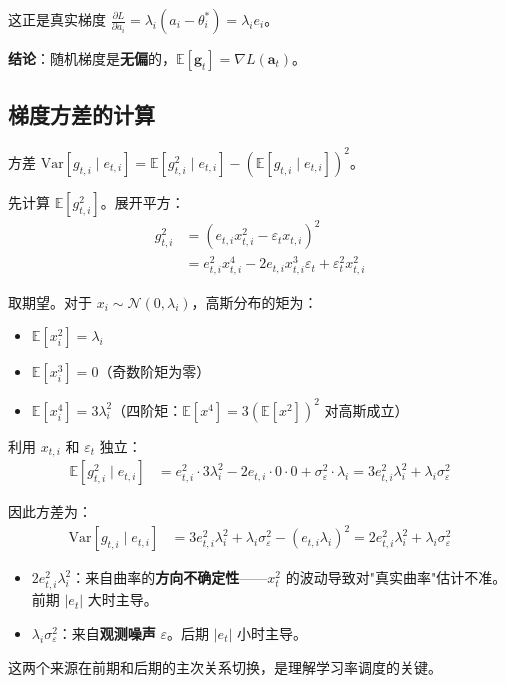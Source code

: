 \documentclass[12pt, a4paper]{ctexart}
\begin{document}
这正是真实梯度 $\frac{\partial L}{\partial a_i} = \lambda_i (a_i - \theta_i^*) = \lambda_i e_i$。

\textbf{结论}：随机梯度是\textbf{无偏}的，$\mathbb{E}[\mathbf{g}_t] = \nabla L(\mathbf{a}_t)$。

\subsection{梯度方差的计算}

方差 $\text{Var}[g_{t,i} \mid e_{t,i}] = \mathbb{E}[g_{t,i}^2 \mid e_{t,i}] - (\mathbb{E}[g_{t,i} \mid e_{t,i}])^2$。

先计算 $\mathbb{E}[g_{t,i}^2]$。展开平方：
\begin{align}
    g_{t,i}^2 &= (e_{t,i} x_{t,i}^2 - \varepsilon_t x_{t,i})^2 \\
    &= e_{t,i}^2 x_{t,i}^4 - 2 e_{t,i} x_{t,i}^3 \varepsilon_t + \varepsilon_t^2 x_{t,i}^2
\end{align}

取期望。对于 $x_i \sim \mathcal{N}(0, \lambda_i)$，高斯分布的矩为：
\begin{itemize}
    \item $\mathbb{E}[x_i^2] = \lambda_i$
    \item $\mathbb{E}[x_i^3] = 0$（奇数阶矩为零）
    \item $\mathbb{E}[x_i^4] = 3\lambda_i^2$（四阶矩：$\mathbb{E}[x^4] = 3(\mathbb{E}[x^2])^2$ 对高斯成立）
\end{itemize}

利用 $x_{t,i}$ 和 $\varepsilon_t$ 独立：
\begin{align}
    \mathbb{E}[g_{t,i}^2 \mid e_{t,i}] &= e_{t,i}^2 \cdot 3\lambda_i^2 - 2 e_{t,i} \cdot 0 \cdot 0 + \sigma_\varepsilon^2 \cdot \lambda_i = 3 e_{t,i}^2 \lambda_i^2 + \lambda_i \sigma_\varepsilon^2
\end{align}

因此方差为：
\begin{align}
    \text{Var}[g_{t,i} \mid e_{t,i}] &= 3 e_{t,i}^2 \lambda_i^2 + \lambda_i \sigma_\varepsilon^2 - (e_{t,i} \lambda_i)^2 = \boxed{2 e_{t,i}^2 \lambda_i^2 + \lambda_i \sigma_\varepsilon^2}
\end{align}

\begin{insight}[梯度方差的两个来源]
\begin{itemize}
    \item $2e_{t,i}^2 \lambda_i^2$：来自曲率的\textbf{方向不确定性}——$x_t^2$ 的波动导致对"真实曲率"估计不准。前期 $|e_t|$ 大时主导。
    \item $\lambda_i \sigma_\varepsilon^2$：来自\textbf{观测噪声} $\varepsilon$。后期 $|e_t|$ 小时主导。
\end{itemize}
这两个来源在前期和后期的主次关系切换，是理解学习率调度的关键。
\end{insight}
\end{document}
